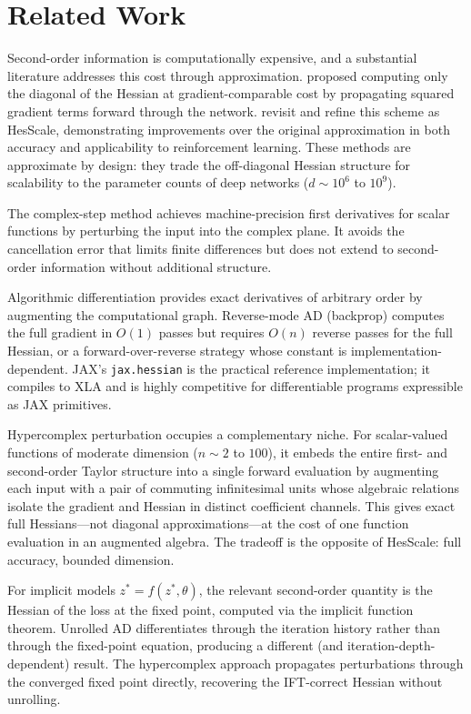 
\section{Related Work}

Second-order information is computationally expensive, and a substantial literature
addresses this cost through approximation. \citet{becker1989} proposed computing only
the diagonal of the Hessian at gradient-comparable cost by propagating squared
gradient terms forward through the network. \citet{elsayed2024} revisit and refine
this scheme as HesScale, demonstrating improvements over the original approximation
in both accuracy and applicability to reinforcement learning. These methods are
approximate by design: they trade the off-diagonal Hessian structure for scalability
to the parameter counts of deep networks ($d \sim 10^6$ to $10^9$).

The complex-step method \citep{lyness1967,squire1998} achieves machine-precision first
derivatives for scalar functions by perturbing the input into the complex plane. It
avoids the cancellation error that limits finite differences but does not extend to
second-order information without additional structure.

Algorithmic differentiation \citep{griewank2008} provides exact derivatives of
arbitrary order by augmenting the computational graph. Reverse-mode AD (backprop)
computes the full gradient in $O(1)$ passes but requires $O(n)$ reverse passes for
the full Hessian, or a forward-over-reverse strategy whose constant is
implementation-dependent. JAX's \texttt{jax.hessian} is the practical reference
implementation; it compiles to XLA and is highly competitive for differentiable
programs expressible as JAX primitives.

Hypercomplex perturbation occupies a complementary niche. For scalar-valued functions
of moderate dimension ($n \sim 2$ to $100$), it embeds the entire first- and
second-order Taylor structure into a single forward evaluation by augmenting each
input with a pair of commuting infinitesimal units whose algebraic relations isolate
the gradient and Hessian in distinct coefficient channels. This gives exact full
Hessians---not diagonal approximations---at the cost of one function evaluation in an
augmented algebra. The tradeoff is the opposite of HesScale: full accuracy, bounded
dimension.

For implicit models $z^* = f(z^*, \theta)$, the relevant second-order quantity is the
Hessian of the loss at the fixed point, computed via the implicit function theorem.
Unrolled AD differentiates through the iteration history rather than through the
fixed-point equation, producing a different (and iteration-depth-dependent) result.
The hypercomplex approach propagates perturbations through the converged fixed point
directly, recovering the IFT-correct Hessian without unrolling.


